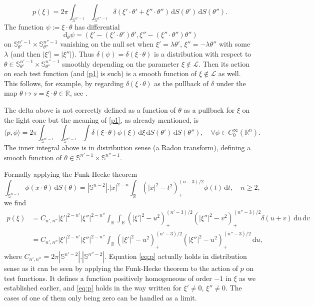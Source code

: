 \documentclass[11pt]{amsart}
\theoremstyle{definition}
\theoremstyle{remark}
\numberwithin{equation}{section}
\newcommand{\rb}{\mathbb{R}}
\renewcommand{\d}{\,\mathrm{d}}
\renewcommand{\sb}{\mathbb{S}}
\begin{document}
\begin{equation}\label{p1}
    p(\xi ) = 2\pi \int_{\sb^{n'-1}} \int_{\sb^{n''-1}} \delta(\xi' \cdot \theta' + \xi'' \cdot \theta'') \d S(\theta') \d S(\theta'').
\end{equation}
The function $\psi:=  \xi\cdot\theta$ has differential 
\[
\d_\theta\psi = (\xi'-(\xi'\cdot\theta') \theta', \xi''-(\xi''\cdot\theta'') \theta'')
\]
on  $\sb_{\theta'}^{n'-1}\times \sb_{\theta''}^{n''-1}$   vanishing on the null set when $\xi' =\lambda \theta'$, $\xi''= -\lambda \theta''$ with some $\lambda$ (and then  $|\xi'|=|\xi''|$). Thus $\delta(\psi) = \delta(\xi\cdot\theta)$ is a distribution with respect to $\theta\in\sb_{\theta'}^{n'-1}\times \sb_{\theta''}^{n''-1} $ smoothly depending on the parameter $\xi\not\in\mathcal{L}$.  Then its action on each test function (and \eqref{p1} is such) is a smooth function of $\xi\not\in\mathcal{L}$ as well. This follows, for  example, by regarding $\delta(\xi\cdot\theta)$ as the pullback of $\delta$ under the map $\theta\mapsto s=\xi\cdot\theta\in \rb$, see \cite[Theorem~7.2.1]{Friedlander1998}.  



The delta above is not correctly defined as a function of $\theta$ as a pullback for $\xi$ on the light cone but the meaning of \eqref{p1}, as already mentioned, is
\begin{equation}   \label{pphi}
\langle p , \phi \rangle = 2\pi \int_{\sb^{n'-1}} \int_{\sb^{n''-1}}\int \delta(\xi \cdot \theta)\phi(\xi) \d\xi \d S(\theta') \d S(\theta''),\quad \forall \phi\in C_0^\infty(\rb^n).
\end{equation} 
The inner integral above is in distribution sense (a Radon transform), defining a smooth function of $\theta\in \sb ^{n'-1}\times \sb ^{n''-1}$. 
 


Formally applying the Funk-Hecke theorem 
\[
\int_{\sb^{n-1}} \phi(x\cdot\theta) \d S(\theta) = |\sb^{n-2}|.|x|^{2-n} \int_{\rb} (|x|^2-t^2)_+^{(n-3)/2} \phi(t)\d t, \quad n\ge2,
\]
 we find 
    \begin{align} 
    p(\xi) &= C_{n',n''} |\xi'|^{2-n'} |\xi''|^{2-n''} \int_{\rb} \int_{\rb} (|\xi'|^2 - u^2)_+^{(n'-3)/2} (|\xi''|^2-v^2)_+^{(n''-3)/2} \delta(u+v) \d u \d v \\
    &= C_{n',n''} |\xi'|^{2-n'} |\xi''|^{2-n''} \int_{\rb} (|\xi'|^2 - u^2)_+^{(n'-3)/2} (|\xi''|^2-u^2)_+^{(n''-3)/2}  \d u ,   \label{eq:p}
\end{align}
where $C_{n',n''} =2\pi |\sb^{n'-2}|.|\sb^{n''-2}|$. Equation \eqref{eq:p} actually holds in distribution sense as it can be seen by applying the Funk-Hecke theorem to the action of $p$ on test functions. It defines a function positively homogeneous of order $-1$ in $\xi$ as we established earlier,  and \eqref{eq:p} holds in the way written for $\xi'\not=0$, $\xi''\not=0$. The cases of one of them only being zero can be handled as a limit. 
\end{document}
